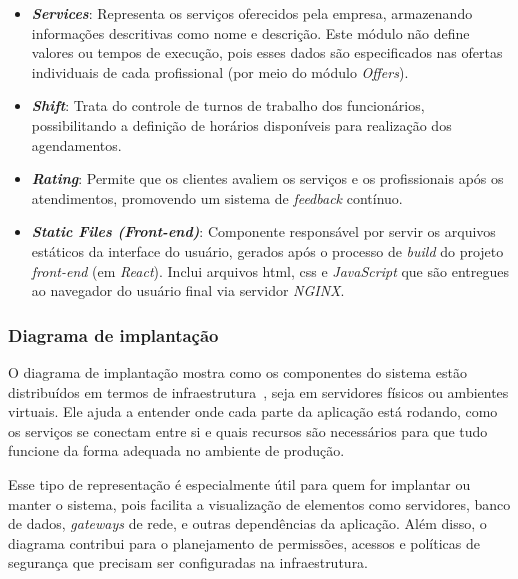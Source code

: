 \begin{itemize}
  \item \textbf{\emph{Services}}: Representa os serviços oferecidos pela empresa, armazenando informações descritivas como nome e descrição. Este módulo não define valores ou tempos de execução, pois esses dados são especificados nas ofertas individuais de cada profissional (por meio do módulo \textit{Offers}).

  \item \textbf{\emph{Shift}}: Trata do controle de turnos de trabalho dos funcionários, possibilitando a definição de horários disponíveis para realização dos agendamentos.

  \item \textbf{\emph{Rating}}: Permite que os clientes avaliem os serviços e os profissionais após os atendimentos, promovendo um sistema de \emph{feedback} contínuo.
  
  \item \textbf{\emph{Static Files (Front-end)}}: Componente responsável por servir os arquivos estáticos da interface do usuário, gerados após o processo de \textit{build} do projeto \emph{front-end} (em \emph{React}). Inclui arquivos \gls{html}, \gls{css} e \emph{JavaScript} que são entregues ao navegador do usuário final via servidor \emph{NGINX}.
\end{itemize}

\subsubsection{Diagrama de implantação}

O diagrama de implantação mostra como os componentes do sistema estão distribuídos em termos de infraestrutura~\cite{Booch2005}, seja em servidores físicos ou ambientes virtuais. Ele ajuda a entender onde cada parte da aplicação está rodando, como os serviços se conectam entre si e quais recursos são necessários para que tudo funcione da forma adequada no ambiente de produção.

Esse tipo de representação é especialmente útil para quem for implantar ou manter o sistema, pois facilita a visualização de elementos como servidores, banco de dados, \emph{gateways} de rede, e outras dependências da aplicação. Além disso, o diagrama contribui para o planejamento de permissões, acessos e políticas de segurança que precisam ser configuradas na infraestrutura.

